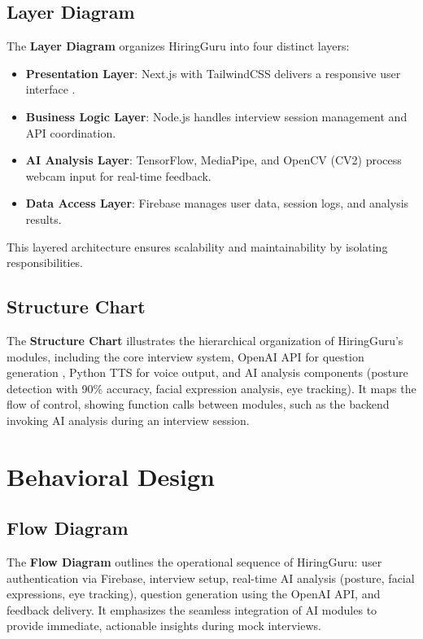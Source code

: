 \subsection{Layer Diagram}
The \textbf{Layer Diagram} organizes HiringGuru into four distinct layers:
\begin{itemize}
    \item \textbf{Presentation Layer}: Next.js with TailwindCSS delivers a responsive user interface \cite{vercel2023nextjs}.
    \item \textbf{Business Logic Layer}: Node.js handles interview session management and API coordination.
    \item \textbf{AI Analysis Layer}: TensorFlow, MediaPipe, and OpenCV (CV2) process webcam input for real-time feedback.
    \item \textbf{Data Access Layer}: Firebase manages user data, session logs, and analysis results.
\end{itemize}
This layered architecture ensures scalability and maintainability by isolating responsibilities.

\subsection{Structure Chart}
The \textbf{Structure Chart} illustrates the hierarchical organization of HiringGuru’s modules, including the core interview system, OpenAI API for question generation \cite{openai2023api}, Python TTS for voice output, and AI analysis components (posture detection with 90\% accuracy, facial expression analysis, eye tracking). It maps the flow of control, showing function calls between modules, such as the backend invoking AI analysis during an interview session.

\section{Behavioral Design}

\subsection{Flow Diagram}
The \textbf{Flow Diagram} outlines the operational sequence of HiringGuru: user authentication via Firebase, interview setup, real-time AI analysis (posture, facial expressions, eye tracking), question generation using the OpenAI API, and feedback delivery. It emphasizes the seamless integration of AI modules to provide immediate, actionable insights during mock interviews.

